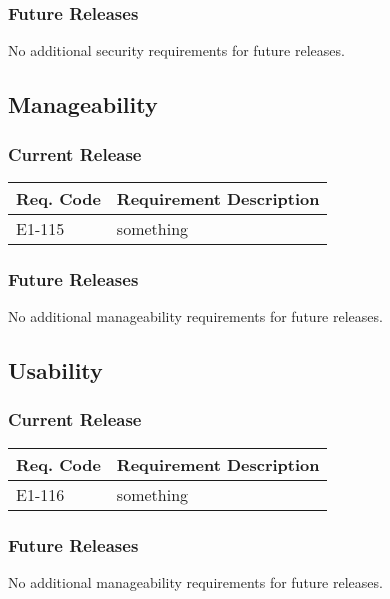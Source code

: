 \documentclass[12pt]{article}
\begin{document}
\subsubsection{Future Releases}
No additional security requirements for future releases.


\subsection{Manageability}

\subsubsection{Current Release}

\begin{table}[!h]
	\begin{tabular}{| l | l |}
		\hline
		\textbf{Req. Code} & \textbf{Requirement Description}\\
		\hline
		E1-115	& something\\
		\hline
	\end{tabular}
	\label{tab:ManageabilityRequirements}
\end{table}

\subsubsection{Future Releases}
No additional manageability requirements for future releases.


\subsection{Usability}

\subsubsection{Current Release}

\begin{table}[!h]
	\begin{tabular}{| l | l |}
		\hline
		\textbf{Req. Code} & \textbf{Requirement Description}\\
		\hline
		E1-116	& something\\
		\hline
	\end{tabular}
	\label{tab:UsabilityRequirements}
\end{table}

\subsubsection{Future Releases}
No additional manageability requirements for future releases.
\end{document}
